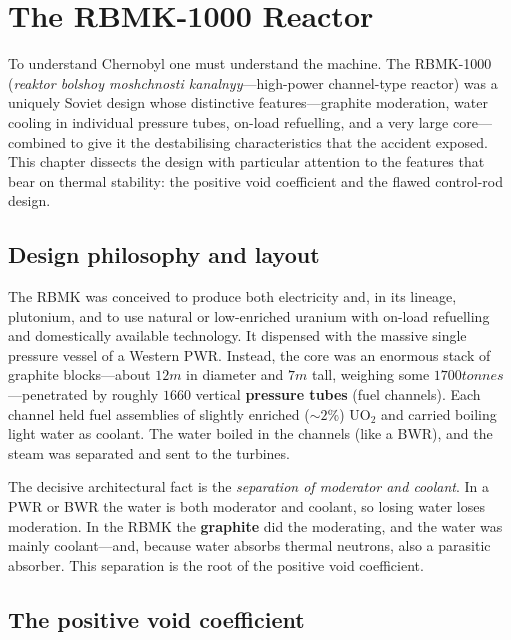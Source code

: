\chapter{The RBMK-1000 Reactor}
\label{ch:rbmk}

To understand Chernobyl one must understand the machine. The RBMK-1000
(\emph{reaktor bolshoy moshchnosti kanalnyy}---high-power channel-type reactor) was
a uniquely Soviet design whose distinctive features---graphite moderation, water
cooling in individual pressure tubes, on-load refuelling, and a very large
core---combined to give it the destabilising characteristics that the accident
exposed. This chapter dissects the design with particular attention to the
features that bear on thermal stability: the positive void coefficient and the
flawed control-rod design.

\section{Design philosophy and layout}

The RBMK was conceived to produce both electricity and, in its lineage, plutonium,
and to use natural or low-enriched uranium with on-load refuelling and
domestically available technology. It dispensed with the massive single
pressure vessel of a Western PWR. Instead, the core was an enormous stack of
graphite blocks---about $12\unit{m}$ in diameter and $7\unit{m}$ tall, weighing
some $1700\unit{tonnes}$---penetrated by roughly $1660$ vertical
\textbf{pressure tubes} (fuel channels). Each channel held fuel assemblies of
slightly enriched ($\sim 2\%$) $\mathrm{UO_2}$ and carried boiling light water as
coolant. The water boiled in the channels (like a BWR), and the steam was
separated and sent to the turbines.

The decisive architectural fact is the \emph{separation of moderator and coolant}.
In a PWR or BWR the water is both moderator and coolant, so losing water loses
moderation. In the RBMK the \textbf{graphite} did the moderating, and the water was
mainly coolant---and, because water absorbs thermal neutrons, also a parasitic
absorber. This separation is the root of the positive void coefficient.

\section{The positive void coefficient}

